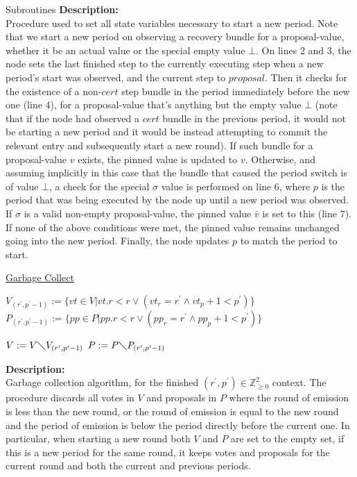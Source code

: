 \documentclass[10pt,a4paper]{article}
\begin{document}
\begin{section}{Subroutines}
\noindent \textbf{Description:}\\
Procedure used to set all state variables necessary to start a new period.
Note that we start a new period on observing a recovery bundle for a proposal-value, whether it be
an actual value or the special empty value $\bot$.
On lines 2 and 3, the node sets the last finished step to the currently executing step when a new period's
start was observed, and the current step to $proposal$.
Then it checks for the existence of a non-$cert$ step bundle in the period immediately before the new one (line 4), 
for a proposal-value that's anything but the empty value $\bot$ (note that if the node had observed a $cert$
bundle in the previous period, it would not be starting a new period and it would be instead attempting to commit
the relevant entry and subsequently start a new round). If such bundle for a proposal-value $v$ exists, the pinned 
value is updated to $v$.
Otherwise, and assuming implicitly in this case that the bundle that caused the period switch is of value $\bot$,
a check for the special $\sigma$ value is performed on line 6, where $p$ is the period that was being executed 
by the node up until a new period was observed. If $\sigma$ is a valid non-empty proposal-value, the pinned 
value $\bar{v}$ is set to this (line 7).
If none of the above conditions were met, the pinned value remains unchanged going into the new period.
Finally, the node updates $p$ to match the period to start.


\begin{algorithm}[H]
    \caption{\underline{Garbage Collect}}
    \label{algo:garbage-collect}
    \begin{algorithmic}[1]

    \State $V_{(r^\prime,p^\prime-1)} := \{ vt \in V | vt.r < r \lor (vt_r=r^\prime \land vt_p + 1 < p^\prime) \}$
    \State $P_{(r^\prime,p^\prime-1)} := \{ pp \in P | pp.r < r \lor (pp_r=r^\prime \land pp_p + 1 < p^\prime) \}$

    \State $V := V\diagdown V_{(r^\prime,p^\prime-1)}$
    \State $P := P\diagdown P_{(r^\prime,p^\prime-1)}$

    \EndFunction
    \end{algorithmic}
\end{algorithm}

\noindent \textbf{Description:}\\
Garbage collection algorithm, for the finished $(r^\prime,p^\prime)\in\mathbb{Z}_{\ge 0}^2$ context.
The procedure discards all votes in $V$ and proposals in $P$ where the round of emission is less than the
new round, or the round of emission is equal to the new round and the period of emission is below the period
directly before the current one.
In particular, when starting a new round both $V$ and $P$ are set to the empty set,
if this is a new period for the same round, it keeps votes and proposals for the current round
and both the current and previous periods.


\end{section}
\end{document}

